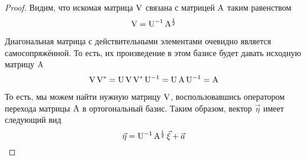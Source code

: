 \begin{proof}
    Видим, что искомая матрица $\mathrm{V}$ связана с матрицей $\mathrm{A}$
    таким равенством
    $$\mathrm{V} = \mathrm{U^{-1}}\, {\mathrm{A^{\frac{1}{2}}}}$$

    Диагональная матрица с действительными элементами очевидно является
    самосопряжённой. То есть, их произведение в этом базисе будет давать
    исходную матрицу $\mathrm{A}$
    $$\mathrm{V}\, {\mathrm{V^*}}
        = \mathrm{U}\, {\mathrm{V}\, {\mathrm{V^*}\, {\mathrm{U^{-1}}}}}
        = \mathrm{U}\, {\mathrm{A}\, {\mathrm{U^{-1}}}} = \mathrm{A}$$

    То есть, мы можем найти нужную матрицу $\mathrm{V}$, воспользовавшись
    оператором перехода матрицы $\mathrm{A}$ в ортогональный базис. Таким
    образом, вектор $\vec{\eta}$ имеет следующий вид
    $$\vec{\eta}
        = \mathrm{U^{-1}}\, {\mathrm{A^{\frac{1}{2}}}\, {\vec{\xi}}}
            + \vec{a}$$
\end{proof}
